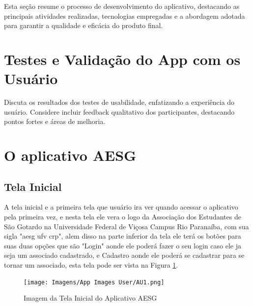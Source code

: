 \documentclass[
    12pt,                   %
    openright,              %
    oneside,                %
    a4paper,                %
    sumario=tradicional,    %
    english,                %
    brazil,                 %
    ]{abntex2}
\begin{document}
        Esta seção resume o processo de desenvolvimento do aplicativo, destacando as principais atividades realizadas, tecnologias empregadas e a abordagem adotada para garantir a qualidade e eficácia do produto final.
    
    \section{Testes e Validação do App com os Usuário}
    
    Discuta os resultados dos testes de usabilidade, enfatizando a experiência do usuário. Considere incluir feedback qualitativo dos participantes, destacando pontos fortes e áreas de melhoria.
    
    \section{O aplicativo AESG}
        \subsection{Tela Inicial}
            A tela inicial e a primeira tela que usuário ira ver quando acessar o aplicativo pela primeira vez, e nesta tela ele vera o logo da Associação dos Estudantes de São Gotardo na Universidade Federal de Viçosa Campus Rio Paranaíba, com sua sigla "aesg ufv crp", alem disso na parte inferior da tela ele terá os botões para suas duas opções que são "Login" aonde ele poderá fazer o seu login caso ele ja seja um associado cadastrado, e Cadastro aonde ele poderá se cadastrar para se tornar um associado, esta tela pode ser vista na Figura \ref{fig:AppTelaInicial}.

            \begin{figure}[!h]
                \begin{center}
                \centering
                \texttt{[image: Imagens/App Images          User/AU1.png]}
                \end{center}
                \caption[Imagem da Tela Inicial do Aplicativo AESG]{ 
                Imagem da Tela Inicial do Aplicativo AESG}
                \label{fig:AppTelaInicial}
            \end{figure}
            
\end{document}
